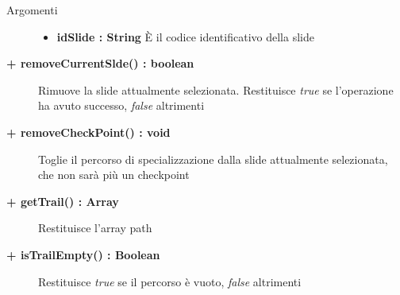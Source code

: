 \begin{description}
\begin{description}
		\begin{description}
			\item[Argomenti] \hfill
				\begin{itemize}
				
					\item \textbf{idSlide : String	} \hfill
					È il codice identificativo della slide
					
				\end{itemize}
			
		\end{description}
			
	\end{description}
	
	\begin{description}
		\item[\textbf{\color{blue}+ removeCurrentSlde() : boolean			}] \hfill
			Rimuove la slide attualmente selezionata. Restituisce \textit{true} se l'operazione ha avuto successo, \textit{false} altrimenti 
			
	\end{description}
	
	\begin{description}
		\item[\textbf{\color{blue}+ removeCheckPoint() : void			}] \hfill
			Toglie il percorso di specializzazione dalla slide attualmente selezionata, che non sarà più un checkpoint
			
	\end{description}
	
	\begin{description}
		\item[\textbf{\color{blue}+ getTrail() : Array			}] \hfill
			Restituisce l'array path
			
	\end{description}
	
	\begin{description}
		\item[\textbf{\color{blue}+ isTrailEmpty() : Boolean			}] \hfill
			Restituisce \textit{true} se il percorso è vuoto, \textit{false} altrimenti
			
	\end{description}
	
	

\end{description}





























